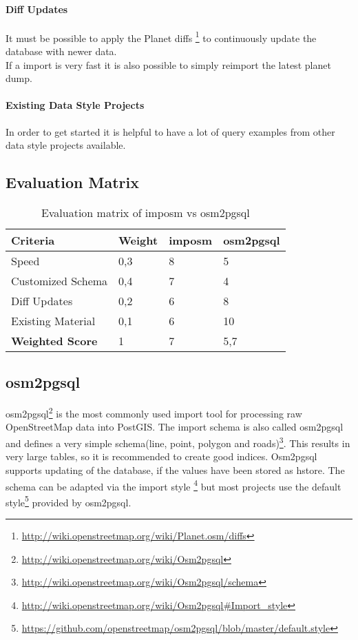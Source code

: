 \paragraph{Diff Updates}
It must be possible to apply the Planet diffs \footnote{\url{http://wiki.openstreetmap.org/wiki/Planet.osm/diffs}} 
to continuously update the database with newer data.
\\
If a import is very fast it is also possible to simply reimport the latest
planet dump.

\paragraph{Existing Data Style Projects}
In order to get started it is helpful to have a lot of query examples
from other data style projects available.

\subsection{Evaluation Matrix}\label{evaluation_matrix}

\begin{table}[H]
\centering
    \begin{tabular}{llll}
    \hline
    Criteria         & Weight & imposm & osm2pgsql \\
    \hline
    Speed             & 0,3    & 8      & 5         \\
    Customized Schema & 0,4    & 7      & 4         \\
    Diff Updates      & 0,2    & 6      & 8         \\
    Existing Material & 0,1    & 6      & 10        \\
    \hline
    \textbf{Weighted Score} & 1      & 7      & 5,7       \\
    \end{tabular}
    \caption{Evaluation matrix of imposm vs osm2pgsql}
\end{table}


\subsection{osm2pgsql}\label{osm2pgsql_importer}

osm2pgsql\footnote{\url{http://wiki.openstreetmap.org/wiki/Osm2pgsql}} is the
most commonly used import tool for processing raw OpenStreetMap data into PostGIS.
The import schema is also called osm2pgsql and defines a very
simple schema(line, point, polygon and
roads)\footnote{\url{http://wiki.openstreetmap.org/wiki/Osm2pgsql/schema}}.
This results in very large tables, so it is recommended to create good
indices. Osm2pgsql supports updating of the database, if the values have
been stored as hstore. The schema can be adapted via the import style \footnote{\url{http://wiki.openstreetmap.org/wiki/Osm2pgsql\#Import_style}}
but most projects use the default style\footnote{\url{https://github.com/openstreetmap/osm2pgsql/blob/master/default.style}} provided by osm2pgsql.

